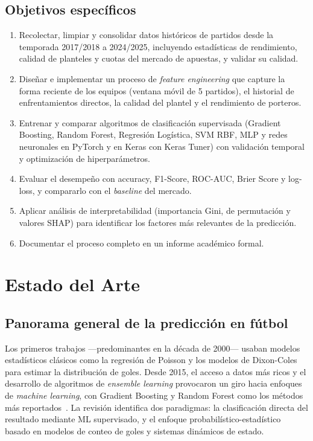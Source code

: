 \documentclass{ieeeaccess}
\begin{document}
\subsection{Objetivos específicos}
\begin{enumerate}
\item Recolectar, limpiar y consolidar datos históricos de partidos desde la temporada 2017/2018 a 2024/2025, incluyendo estadísticas de rendimiento, calidad de planteles y cuotas del mercado de apuestas, y validar su calidad.
\item Diseñar e implementar un proceso de \textit{feature engineering} que capture la forma reciente de los equipos (ventana móvil de 5 partidos), el historial de enfrentamientos directos, la calidad del plantel y el rendimiento de porteros.
\item Entrenar y comparar algoritmos de clasificación supervisada (Gradient Boosting, Random Forest, Regresión Logística, SVM RBF, MLP y redes neuronales en PyTorch y en Keras con Keras Tuner) con validación temporal y optimización de hiperparámetros.
\item Evaluar el desempeño con accuracy, F1-Score, ROC-AUC, Brier Score y log-loss, y compararlo con el \textit{baseline} del mercado.
\item Aplicar análisis de interpretabilidad (importancia Gini, de permutación y valores SHAP) para identificar los factores más relevantes de la predicción.
\item Documentar el proceso completo en un informe académico formal.
\end{enumerate}

\section{Estado del Arte}
\label{sec:estado}

\subsection{Panorama general de la predicción en fútbol}
Los primeros trabajos ---predominantes en la década de 2000--- usaban modelos estadísticos clásicos como la regresión de Poisson y los modelos de Dixon-Coles para estimar la distribución de goles. Desde 2015, el acceso a datos más ricos y el desarrollo de algoritmos de \textit{ensemble learning} provocaron un giro hacia enfoques de \textit{machine learning}, con Gradient Boosting y Random Forest como los métodos más reportados~\cite{ricogonzalez2023ml}. La revisión identifica dos paradigmas: la clasificación directa del resultado mediante ML supervisado, y el enfoque probabilístico-estadístico basado en modelos de conteo de goles y sistemas dinámicos de estado.
\end{document}
